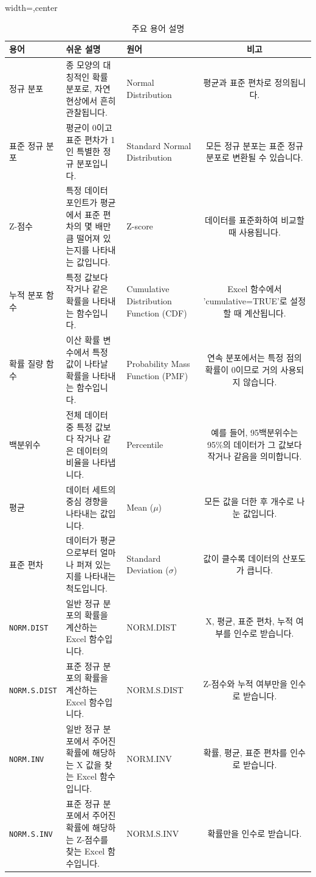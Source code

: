 \documentclass[11pt,a4paper]{article}
\theoremstyle{definition}
\begin{document}
\begin{table}[h!]
\centering
\caption{주요 용어 설명}
\label{tab:glossary}
\begin{adjustbox}{width=\textwidth,center}
\begin{tabular}{lllc}
\toprule
\textbf{용어} & \textbf{쉬운 설명} & \textbf{원어} & \textbf{비고} \\
\midrule
정규 분포 & 종 모양의 대칭적인 확률 분포로, 자연 현상에서 흔히 관찰됩니다. & Normal Distribution & 평균과 표준 편차로 정의됩니다. \\
표준 정규 분포 & 평균이 0이고 표준 편차가 1인 특별한 정규 분포입니다. & Standard Normal Distribution & 모든 정규 분포는 표준 정규 분포로 변환될 수 있습니다. \\
Z-점수 & 특정 데이터 포인트가 평균에서 표준 편차의 몇 배만큼 떨어져 있는지를 나타내는 값입니다. & Z-score & 데이터를 표준화하여 비교할 때 사용됩니다. \\
누적 분포 함수 & 특정 값보다 작거나 같은 확률을 나타내는 함수입니다. & Cumulative Distribution Function (CDF) & Excel 함수에서 'cumulative=TRUE'로 설정할 때 계산됩니다. \\
확률 질량 함수 & 이산 확률 변수에서 특정 값이 나타날 확률을 나타내는 함수입니다. & Probability Mass Function (PMF) & 연속 분포에서는 특정 점의 확률이 0이므로 거의 사용되지 않습니다. \\
백분위수 & 전체 데이터 중 특정 값보다 작거나 같은 데이터의 비율을 나타냅니다. & Percentile & 예를 들어, 95백분위수는 95\%의 데이터가 그 값보다 작거나 같음을 의미합니다. \\
평균 & 데이터 세트의 중심 경향을 나타내는 값입니다. & Mean ($\mu$) & 모든 값을 더한 후 개수로 나눈 값입니다. \\
표준 편차 & 데이터가 평균으로부터 얼마나 퍼져 있는지를 나타내는 척도입니다. & Standard Deviation ($\sigma$) & 값이 클수록 데이터의 산포도가 큽니다. \\
\texttt{NORM.DIST} & 일반 정규 분포의 확률을 계산하는 Excel 함수입니다. & NORM.DIST & X, 평균, 표준 편차, 누적 여부를 인수로 받습니다. \\
\texttt{NORM.S.DIST} & 표준 정규 분포의 확률을 계산하는 Excel 함수입니다. & NORM.S.DIST & Z-점수와 누적 여부만을 인수로 받습니다. \\
\texttt{NORM.INV} & 일반 정규 분포에서 주어진 확률에 해당하는 X 값을 찾는 Excel 함수입니다. & NORM.INV & 확률, 평균, 표준 편차를 인수로 받습니다. \\
\texttt{NORM.S.INV} & 표준 정규 분포에서 주어진 확률에 해당하는 Z-점수를 찾는 Excel 함수입니다. & NORM.S.INV & 확률만을 인수로 받습니다. \\
\bottomrule
\end{tabular}
\end{adjustbox}
\end{table}
\end{document}
